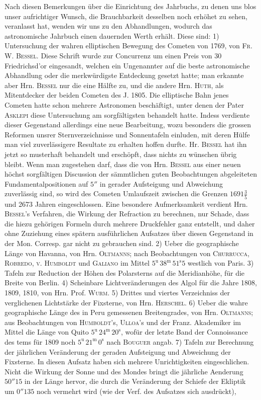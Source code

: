 Nach diesen Bemerkungen über die Einrichtung des Jahrbuchs, zu denen uns blos unser aufrichtiger Wunsch, die Brauchbarkeit desselben noch erhöhet zu sehen, veranlasst hat, wenden wir uns zu den Abhandlungen, wodurch das astronomische Jahrbuch einen dauernden Werth erhält. Diese sind: 1) Untersuchung der wahren elliptischen Bewegung des Cometen von 1769, von \textsc{Fr. W. Bessel}. Diese Schrift wurde zur Concurrenz um einen Preis von 30 Friedrichsd'or eingesandt, welchen ein Ungenannter auf die beste astronomische Abhandlung oder die merkwürdigste Entdeckung gesetzt hatte; man erkannte aber Hrn. \textsc{Bessel} nur die eine Hälfte zu, und die andere Hrn. \textsc{Huth}, als Mitentdecker der beiden Cometen des J. 1805. Die elliptische Bahn jenes Cometen hatte schon mehrere Astronomen beschäftigt, unter denen der Pater \textsc{Asklepi} diese Untersuchung am sorgfältigsten behandelt hatte. Indess verdiente dieser Gegenstand allerdings eine neue Bearbeitung, wozu besonders die grossen Reformen unsrer Sternverzeichnisse und Sonnentafeln einluden, mit deren Hülfe man viel zuverlässigere Resultate zu erhalten hoffen durfte. Hr. \textsc{Bessel} hat ihn jetzt so musterhaft behandelt und erschöpft, dass nichts zu wünschen übrig bleibt. Wenn man zugestehen darf, dass die von Hrn. \textsc{Bessel} aus einer neuen höchst sorgfältigen Discussion der sämmtlichen guten Beobachtungen abgeleiteten Fundamentalpositionen auf $5''$ in gerader Aufsteigung und Abweichung zuverlässig sind, so wird des Cometen Umlaufszeit zwischen die Grenzen $1691\frac{3}{5}$ und 2673 Jahren eingeschlossen. Eine besondere Aufmerksamkeit verdient Hrn. \textsc{Bessel}'s Verfahren, die Wirkung der Refraction zu berechnen, nur Schade, dass die hiezu gehörigen Formeln durch mehrere Druckfehler ganz entstellt, und daher ohne Zuziehung eines spätern ausführlichen Aufsatzes über diesen Gegenstand in der Mon. Corresp. gar nicht zu gebrauchen sind. 2) Ueber die geographische Länge von Havanna, von Hrn. \textsc{Oltmanns}; nach Beobachtungen von \textsc{Churrucca}, \textsc{Robredo}, \textsc{v. Humboldt} und \textsc{Galiano} im Mittel $5^{\mathrm u}\,38^{\mathrm m}\,51^{\mathrm s}5$ westlich von Paris. 3) Tafeln zur Reduction der Höhen des Polarsterns auf die Meridianhöhe, für die Breite von Berlin. 4) Scheinbare Lichtveränderungen des Algol für die Jahre 1808, 1809, 1810, von Hrn. Prof. \textsc{Wurm}. 5) Drittes und viertes Verzeichniss der verglichenen Lichtstärke der Fixsterne, von Hrn. \textsc{Herschel}. 6) Ueber die wahre geographische Länge des in Peru gemessenen Breitengrades, von Hrn. \textsc{Oltmanns}; aus Beobachtungen von \textsc{Humboldt}'s, \textsc{Ulloa}'s und der Franz. Akademiker im Mittel die Länge von Quito $5^{\mathrm u}\,24^{\mathrm m}\,20^{\mathrm s}$, wofür der letzte Band der Connoissance des tems für 1809 noch $5^{\mathrm u}\,21^{\mathrm m}\,0^{\mathrm s}$ nach \textsc{Bouguer} angab. 7) Tafeln zur Berechnung der jährlichen Veränderung der geraden Aufsteigung und Abweichung der Fixsterne. In diesen Aufsatz haben sich mehrere Unrichtigkeiten eingeschlichen. Nicht die Wirkung der Sonne und des Mondes bringt die jährliche Aenderung $50''15$ in der Länge hervor, die durch die Veränderung der Schiefe der Ekliptik um $0''135$ noch vermehrt wird (wie der Verf. des Aufsatzes sich ausdrückt), 